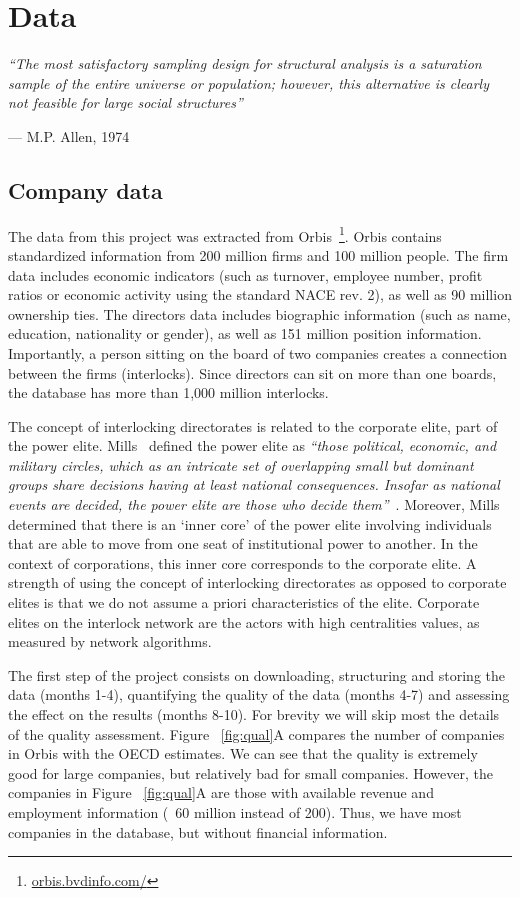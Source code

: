 \section{Data}
\label{sec:data}
\textit{``The most satisfactory sampling design for structural analysis is a saturation sample of the entire universe or population; 
however, this alternative is clearly not feasible for large social structures'' 
}
\begin{flushright}
--- M.P. Allen, 1974
\end{flushright}

\subsection{Company data}
The data from this project was extracted from Orbis~\footnote{\url{orbis.bvdinfo.com/}}.
Orbis contains standardized information from 200 million firms and 100 million people. 
The firm data includes economic indicators (such as turnover, employee number, profit ratios or economic activity using the standard NACE rev. 2),
as well as 90 million ownership ties.
The directors data includes biographic information (such as name, education, nationality or gender), 
as well as 151 million position information.
Importantly, a person sitting on the board of two companies creates a connection between the firms (interlocks).
Since directors can sit on more than one boards, 
the database has more than 1,000 million interlocks.

The concept of interlocking directorates is related to the corporate elite, part of the power elite. 
Mills~\cite{mills1957} defined the power elite as \textit{``those political, economic, and military circles, which as an intricate set of overlapping small but dominant groups share decisions having at least national consequences. Insofar as national events are decided, the power elite are those who decide them''}~\citep{mills1957}. 
Moreover, Mills determined that there is an `inner core' of the power elite involving individuals that are able to move from one seat of institutional power to another. 
In the context of corporations, this inner core corresponds to the corporate elite. 
A strength of using the concept of interlocking directorates as opposed to corporate elites is that we do not assume a priori characteristics of the elite. 
Corporate elites on the interlock network are the actors with high centralities values, as measured by network algorithms.

The first step of the project consists on downloading, structuring and storing the data (months 1-4), quantifying the quality of the data (months 4-7) and assessing the effect on the results (months 8-10). For brevity we will skip most the details of the quality assessment. Figure ~\ref{fig:qual}A compares the number of companies in Orbis with the OECD estimates. We can see that the quality is extremely good for large companies, but relatively bad for small companies. However, the companies in Figure ~\ref{fig:qual}A are those with available revenue and employment information (~60 million instead of 200). Thus, we have most companies in the database, but without financial information. 

